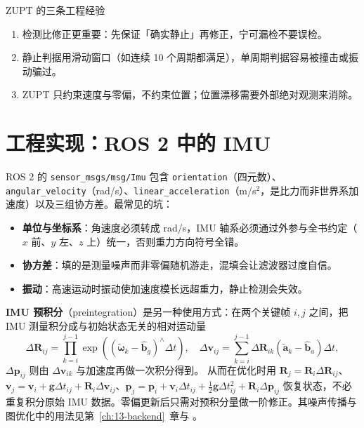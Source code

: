 \begin{keybox}{ZUPT 的三条工程经验}
\begin{enumerate}
  \item 检测比修正更重要：先保证「确实静止」再修正，宁可漏检不要误检。
  \item 静止判据用滑动窗口（如连续 10 个周期都满足），单周期判据容易被撞击或振动骗过。
  \item ZUPT 只约束速度与零偏，不约束位置；位置漂移需要外部绝对观测来消除。
\end{enumerate}
\end{keybox}

\section{工程实现：ROS 2 中的 IMU}\label{sec:06-engineering}

ROS 2 的 \texttt{sensor\_msgs/msg/Imu} 包含 \texttt{orientation}（四元数）、\texttt{angular\_velocity}（rad/s）、\texttt{linear\_acceleration}（m/s$^2$，是比力而非世界系加速度）以及三组协方差。最常见的坑：

\begin{itemize}
  \item \textbf{单位与坐标系}：角速度必须转成 rad/s，IMU 轴系必须通过外参与全书约定（$x$ 前、$y$ 左、$z$ 上）统一，否则重力方向符号全错。
  \item \textbf{协方差}：填的是测量噪声而非零偏随机游走，混填会让滤波器过度自信。
  \item \textbf{振动}：高速运动时振动使加速度模长远超重力，静止检测会失效。
\end{itemize}

\textbf{IMU 预积分}（preintegration）是另一种使用方式：在两个关键帧 $i,j$ 之间，把 IMU 测量积分成与初始状态无关的相对运动量
\begin{equation}
  \Delta\bm{R}_{ij}=\prod_{k=i}^{j-1}\exp\left(\left(\tilde{\bm{\omega}}_k-\hat{\bm{b}}_g\right)^{\wedge}\Delta t\right),
  \quad
  \Delta\bm{v}_{ij}=\sum_{k=i}^{j-1}\Delta\bm{R}_{ik}\left(\tilde{\bm{a}}_k-\hat{\bm{b}}_a\right)\Delta t,
  \label{eq:06-preint}
\end{equation}
$\Delta\bm{p}_{ij}$ 则由 $\Delta\bm{v}_{ik}$ 与加速度再做一次积分得到。
从而在优化时用 $\bm{R}_j=\bm{R}_i\Delta\bm{R}_{ij}$、$\bm{v}_j=\bm{v}_i+\bm{g}\Delta t_{ij}+\bm{R}_i\Delta\bm{v}_{ij}$、$\bm{p}_j=\bm{p}_i+\bm{v}_i\Delta t_{ij}+\tfrac{1}{2}\bm{g}\Delta t_{ij}^{2}+\bm{R}_i\Delta\bm{p}_{ij}$ 恢复状态，不必重复积分原始 IMU 数据。零偏更新后只需对预积分量做一阶修正。其噪声传播与图优化中的用法见第~\ref{ch:13-backend}~章与 \cite{forster2017preintegration}。

